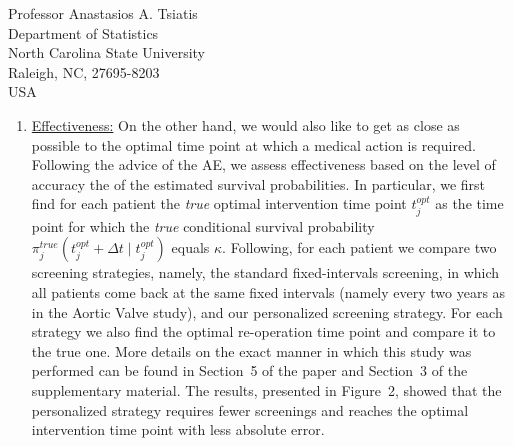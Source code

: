\documentclass[a4paper, 11pt]{letter}
\begin{document}
\begin{letter}{Professor Anastasios A. Tsiatis\\
Department of Statistics\\
North Carolina State University\\
Raleigh, NC, 27695-8203\\
USA}
\begin{itemize}
\begin{enumerate}
    \item \underline{Effectiveness:} On the other hand, we would also like to get as close as possible to the optimal time point at which a medical action is required. Following the advice of the AE, we assess effectiveness based on the level of accuracy the of the estimated survival probabilities. In particular, we first find for each patient the \emph{true} optimal intervention time point $t_j^{opt}$ as the time point for which the \emph{true} conditional survival probability $\pi_j^{true}(t_j^{opt} + \Delta t \mid t_j^{opt})$ equals $\kappa$. Following, for each patient we compare two screening strategies, namely, the standard fixed-intervals screening, in which all patients come back at the same fixed intervals (namely every two years as in the Aortic Valve study), and our personalized screening strategy. For each strategy we also find the optimal re-operation time point and compare it to the true one. More details on the exact manner in which this study was performed can be found in Section~5 of the paper and Section~3 of the supplementary material. The results, presented in Figure~2, showed that the personalized strategy requires fewer screenings and reaches the optimal intervention time point with less absolute error.
    \end{enumerate}


\end{itemize}
\end{letter}
\end{document}
